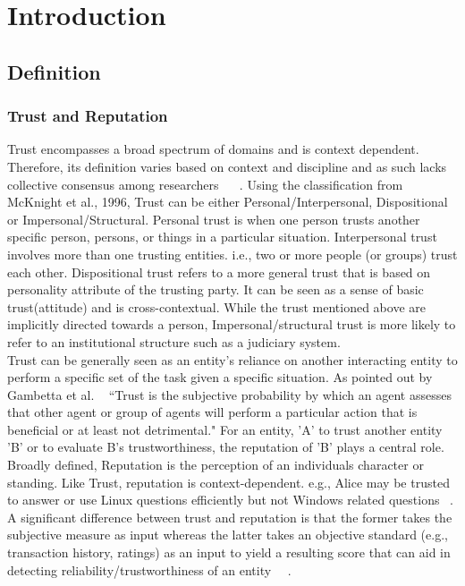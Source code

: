 \chapter{Introduction} \label{ch:intro}

\section{Definition}
\subsection{Trust and Reputation}
Trust encompasses a broad spectrum of domains and is context dependent.
Therefore, its definition varies based on context and discipline and as such
lacks collective consensus among researchers ~\cite{mcknight1996meanings} 
~\cite{mcknight2001trust}.
Using the classification from McKnight et al., 1996, Trust can be either
Personal/Interpersonal, Dispositional or Impersonal/Structural.
Personal trust is when one person trusts another specific person, persons, or
things in a particular situation. Interpersonal trust involves more than one
trusting entities. i.e., two or more people (or groups) trust each other.
Dispositional trust refers to a more general trust that is based on personality
attribute of the trusting party. It can be seen as a sense of basic
trust(attitude) and is cross-contextual. While the trust mentioned above are
implicitly directed towards a person, Impersonal/structural trust is more
likely to refer to an institutional structure such as a judiciary system. \\

Trust can be generally seen as an entity's reliance on another interacting
entity to perform a specific set of the task given a specific situation.  As
pointed out by Gambetta et al. ~\cite{gambetta2000can} ``Trust is the
subjective probability by which an agent assesses that other agent or group of
agents will perform a particular action that is beneficial or at least not
detrimental." For an entity, 'A' to trust another entity 'B' or to evaluate B's
trustworthiness, the reputation of 'B' plays a central role. Broadly defined,
Reputation is the perception of an individuals character or standing. Like
Trust, reputation is context-dependent. e.g., Alice may be trusted to answer or
use Linux questions efficiently but not Windows related questions
~\cite{zacharia2000collaborative}.  A significant difference between trust and
reputation is that the former takes the subjective measure as input whereas the
latter takes an objective standard (e.g., transaction history, ratings) as an
input to yield a resulting score that can aid in detecting
reliability/trustworthiness of an entity~\cite{Sabater2005}
~\cite{castelfranchi2000trust}. \\


